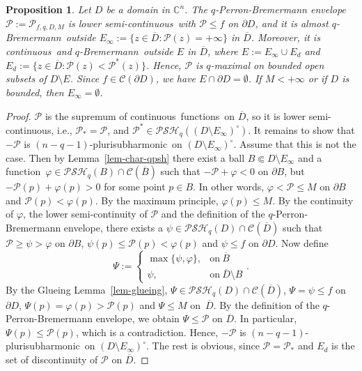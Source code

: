 \documentclass[10pt,a4paper]{amsart}
\newtheorem{prop}[thm]{Proposition}
\numberwithin{equation}{section}
\newcommand{\cbb}{\mathbb{C}}
\newcommand{\ccal}{\mathcal{C}}
\newcommand{\pcal}{\mathcal{P}}
\newcommand{\qbrem}{$q$-Bremermann}
\newcommand{\psh}{pluri\-sub\-harmonic}
\newcommand{\PSH}{\mathcal{PSH}}
\newcommand{\cl}[1]{\overline{#1}}
\newcommand{\cont}{continuous}
\newcommand{\lsc}{lower semi-continuous}
\newcommand{\fct}{function}
\newcommand{\fcts}{functions}
\newcommand{\cld}{\overline{D}}
\newcommand{\relc}{\Subset}
\newcommand{\vphi}{\varphi}
\begin{document}
\begin{prop}\label{prop-q-envelope} Let $D$ be a domain in $\cbb^n$. The $q$-Perron-Bremermann envelope $\pcal:=\pcal_{f,q,D,M}$ is \lsc\ with $\pcal \leq f$ on $\partial D$, and it is almost \qbrem\ outside $E_{\infty}:=\{z \in \cld : \pcal(z)=+\infty\}$ in $\cld$. Moreover, it is \cont\ and \qbrem\ outside $E$ in $\cld$, where $E:=E_\infty \cup E_d$ and $E_d:=\{z \in \cld : \pcal(z) < \pcal^*(z)\}$. Hence, $\pcal$ is $q$-maximal on bounded open subsets of $D\setminus E$. Since $f \in \ccal(\partial D)$, we have $E \cap \partial D = \emptyset$. If $M<+\infty$ or if $D$ is bounded, then $E_\infty=\emptyset$.
\end{prop}

\begin{proof} $\pcal$ is the supremum of \cont\ \fcts\ on $\cld$, so it is \lsc, i.e., $\pcal_*=\pcal$, and $\pcal^* \in \PSH_q((D\setminus E_\infty)^\circ)$. It remains to show that $-\pcal$ is $(n-q-1)$-\psh\ on $(D\setminus E_\infty)^\circ$. Assume that this is not the case. Then by Lemma~\ref{lem-char-qpsh} there exist a ball $B \relc D\setminus E_\infty$ and a \fct\ $\varphi \in \PSH_q(B) \cap \ccal(\cl{B})$ such that $-\pcal + \varphi < 0$ on $\partial B$, but $-\pcal(p) + \varphi(p) >0$ for some point $p \in B$. In other words, $\vphi<\pcal\leq M$ on $\partial B$ and $\pcal(p) < \varphi(p)$. By the maximum principle, $\varphi(p)\leq M$. By the continuity of $\varphi$, the lower semi-continuity of $\pcal$ and the definition of the $q$-Perron-Bremermann envelope, there exists a $\psi \in \PSH_q(D) \cap \ccal(\cld)$ such that $\pcal \geq \psi > \varphi$ on $\partial B$,  $\psi(p)\leq\pcal(p) < \varphi(p)$ and $\psi \leq f$ on $\partial D$. Now define
\[
\Psi:= \begin{cases} \max\{\psi, \varphi\}, & \text{on}\ \cl{B}\\ \psi, & \text{on}\ \cld\setminus B \end{cases}.
\]
By the Glueing Lemma~\ref{lem-glueing}, $\Psi \in \PSH_q(D) \cap \ccal(\cld)$, $\Psi=\psi \leq f$ on $\partial D$, $\Psi(p)= \varphi(p) > \pcal(p)$ and $\Psi \leq M$ on~$\cld$. By the definition of the $q$-Perron-Bremermann envelope, we obtain $\Psi \leq \pcal$ on $\cld$. In particular, $\Psi(p) \leq \pcal(p)$, which is a contradiction. Hence, $-\pcal$ is $(n-q-1)$-\psh\ on $(D\setminus E_\infty)^\circ$. The rest is obvious, since $\pcal=\pcal_*$ and $E_d$ is the set of discontinuity of $\pcal$ on $\cld$.
\end{proof}
\end{document}
